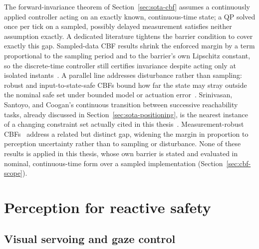 \documentclass[12pt,a4paper,twoside,openright]{report}
\begin{document}
The forward-invariance theorem of Section~\ref{sec:sota-cbf} assumes a continuously applied controller acting on an exactly known, continuous-time state; a QP solved once per tick on a sampled, possibly delayed measurement satisfies neither assumption exactly. A dedicated literature tightens the barrier condition to cover exactly this gap. Sampled-data CBF results shrink the enforced margin by a term proportional to the sampling period and to the barrier's own Lipschitz constant, so the discrete-time controller still certifies invariance despite acting only at isolated instants~\cite{breeden2021sampled}. A parallel line addresses disturbance rather than sampling: robust and input-to-state-safe CBFs bound how far the state may stray outside the nominal safe set under bounded model or actuation error~\cite{kolathaya2019issf}. Srinivasan, Santoyo, and Coogan's continuous transition between successive reachability tasks, already discussed in Section~\ref{sec:sota-positioning}, is the nearest instance of a changing constraint set actually cited in this thesis~\cite{srinivasan2020continuous}. Measurement-robust CBFs~\cite{cosner2021mrcbf} address a related but distinct gap, widening the margin in proportion to perception uncertainty rather than to sampling or disturbance. None of these results is applied in this thesis, whose own barrier is stated and evaluated in nominal, continuous-time form over a sampled implementation (Section~\ref{sec:cbf-scope}).

\section{Perception for reactive safety}
\label{sec:sota-perception}

\subsection{Visual servoing and gaze control}
\label{sec:sota-visual-servoing}
\end{document}
